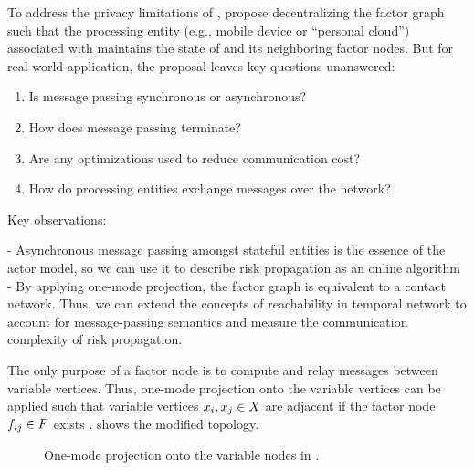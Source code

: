 To address the privacy limitations of \cRiskPropagation{}, \citet{Ayday2021} propose decentralizing the factor graph such that the processing entity (e.g., mobile device or ``personal cloud'') associated with  maintains the state of  and its neighboring factor nodes. But for real-world application, the proposal leaves key questions unanswered:
%
\begin{enumerate}
  \item Is message passing synchronous or asynchronous?
  \item How does message passing terminate?
  \item Are any optimizations used to reduce communication cost?
  \item How do processing entities exchange messages over the network?
\end{enumerate}
%
Key observations:

- Asynchronous message passing amongst stateful entities is the essence of the actor model, so we can use it to describe risk propagation as an online algorithm
- By applying one-mode projection, the factor graph is equivalent to a contact network. Thus, we can extend the concepts of reachability in temporal network to account for message-passing semantics and measure the communication complexity of risk propagation.

The only purpose of a factor node is to compute and relay messages between variable vertices. Thus, one-mode projection onto the variable vertices can be applied such that variable vertices $\vVariable[i],\vVariable[j] \in \vVariables$ are adjacent if the factor node $\vFactor[ij] \in \vFactors$ exists \cite{Zhou2007}.  shows the modified topology.
%
\begin{figure}[htbp]
\centering
{}
\caption[One-mode projection of a factor graph]{One-mode projection onto the variable nodes in .}
\label{fig:projected}
\end{figure}

